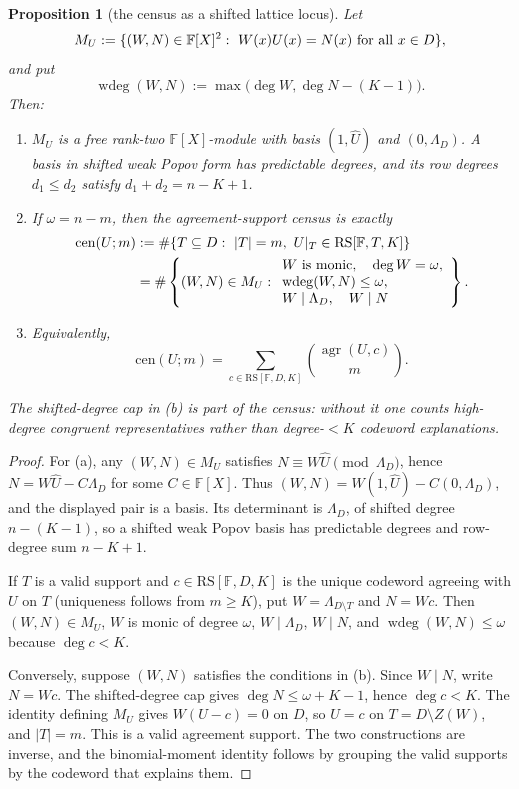 \documentclass[11pt]{article}
\newtheorem{proposition}[proposition]{Proposition}
\theoremstyle{definition}
\theoremstyle{remark}
\newcommand{\F}{\mathbb{F}}
\newcommand{\RS}{\mathrm{RS}}
\begin{document}
\begin{proposition}[the census as a shifted lattice locus]\label{prop:capfp-lattice}
Let
\[
        M_U:=\{(W,N)\in\F[X]^2:\ W(x)U(x)=N(x)\ \textup{for all }x\in D\},
\]
and put
\[
        \operatorname{wdeg}(W,N):=\max\bigl(\deg W,\deg N-(K-1)\bigr).
\]
Then:
\begin{enumerate}[label=\textup{(\alph*)}]
\item $M_U$ is a free rank-two $\F[X]$-module with basis
$(1,\widehat U)$ and $(0,\Lambda_D)$.  A basis in shifted weak Popov
form has predictable degrees, and its row degrees $d_1\le d_2$ satisfy
$d_1+d_2=n-K+1$.
\item If $\omega=n-m$, then the agreement-support census is exactly
\[
\begin{aligned}
\mathrm{cen}(U;m)
&:=\#\{T\subseteq D:\ |T|=m,\ U|_T\in \RS[\F,T,K]\}\\
&=\#\left\{(W,N)\in M_U:
\begin{array}{l}
W\textup{ is monic},\quad \deg W=\omega,\\
\operatorname{wdeg}(W,N)\le\omega,\\
W\mid\Lambda_D,\quad W\mid N
\end{array}
\right\}.
\end{aligned}
\]
\item Equivalently,
\[
        \mathrm{cen}(U;m)=\sum_{c\in \RS[\F,D,K]}\binom{\operatorname{agr}(U,c)}m.
\]
\end{enumerate}
The shifted-degree cap in \textup{(b)} is part of the census: without it one
counts high-degree congruent representatives rather than degree-$<K$ codeword
explanations.
\end{proposition}

\begin{proof}
For \textup{(a)}, any $(W,N)\in M_U$ satisfies
$N\equiv W\widehat U\pmod{\Lambda_D}$, hence
$N=W\widehat U-C\Lambda_D$ for some $C\in\F[X]$.  Thus
$(W,N)=W(1,\widehat U)-C(0,\Lambda_D)$, and the displayed pair is a basis.
Its determinant is $\Lambda_D$, of shifted degree $n-(K-1)$, so a shifted weak
Popov basis has predictable degrees and row-degree sum $n-K+1$.

If $T$ is a valid support and $c\in\RS[\F,D,K]$ is the unique codeword agreeing
with $U$ on $T$ \textup{(uniqueness follows from $m\ge K$)}, put
$W=\Lambda_{D\setminus T}$ and $N=Wc$.  Then $(W,N)\in M_U$, $W$ is monic of
degree $\omega$, $W\mid\Lambda_D$, $W\mid N$, and
$\operatorname{wdeg}(W,N)\le\omega$ because $\deg c<K$.

Conversely, suppose $(W,N)$ satisfies the conditions in \textup{(b)}.  Since
$W\mid N$, write $N=Wc$.  The shifted-degree cap gives
$\deg N\le\omega+K-1$, hence $\deg c<K$.  The identity defining $M_U$ gives
$W(U-c)=0$ on $D$, so $U=c$ on $T=D\setminus Z(W)$, and $|T|=m$.  This is a
valid agreement support.  The two constructions are inverse, and the
binomial-moment identity follows by grouping the valid supports by the
codeword that explains them.
\end{proof}
\end{document}
